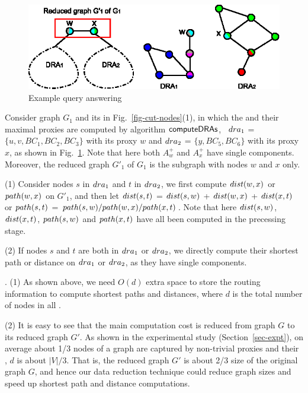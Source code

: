 \begin{figure}[tb!]
\begin{center}
\includegraphics[scale=0.95]{./Example-framework.eps}
\end{center}
\vspace{-2ex}
\caption{Example query answering}
  \label{fig-query-answering}\vspace{-3ex}
\end{figure}

\begin{example}
\label{exm-query}
Consider graph $G_1$ and its \bccs in Fig.~\ref{fig-cut-nodes}(1), in which the \dras and their maximal proxies are computed by algorithm ${\mathsf{computeDRAs}}$, \ie\ ${\sc dra}_1$ = $\{u, v, BC_1, BC_2, BC_3\}$ with its proxy $w$ and ${\sc dra}_2$ = $\{y, BC_5, BC_6\}$ with its proxy $x$, as shown in Fig.~\ref{fig-query-answering}. Note that here both $A^{+}_w$ and $A^{+}_x$ have single components. Moreover, the reduced graph $G'_1$ of $G_1$  is the subgraph with nodes $w$ and $x$ only.




\sstab(1) Consider nodes $s$ in ${\sc dra}_1$  and $t$ in ${\sc dra}_2$, we first compute $\dist(w, x)$ or $\path(w,x)$ on $G'_1$, and then 
let $\dist(s, t)$ = $\dist(s, w)$ + $\dist(w, x)$ + $\dist(x, t)$ or $\path(s, t)$ = $\path(s, w)/\path(w, x)/\path(x, t)$.
Note that here $\dist(s, w)$, $\dist(x, t)$, $\path(s, w)$ and $\path(x, t)$ have all been computed in the precessing stage.


\sstab(2) If nodes $s$ and $t$ are both in ${\sc dra}_1$  or ${\sc dra}_2$, we directly compute their shortest path or distance on  ${\sc dra}_1$  or ${\sc dra}_2$,
as they have single components.
\end{example}

\vspace{-1ex}
.
(1) As shown above, we need $O(d)$ extra space to store the routing information to compute shortest paths and distances, where $d$ is the total number of nodes in all \dras.

\sstab (2) It is easy to see that the main computation cost is reduced from graph $G$ to its reduced graph $G'$. As shown in the experimental study (Section~\ref{sec-expt}), on average about 1/3 nodes of a graph are captured by non-trivial proxies and their \dras, \ie $d$ is about $|V|/3$. That is, the reduced graph $G'$ is about 2/3 size of the original graph $G$, and hence our data reduction technique could reduce graph sizes and speed up shortest path and distance computations. 